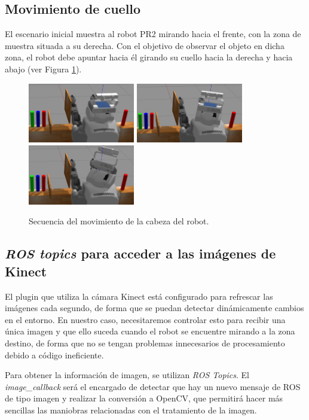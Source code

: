\documentclass[12pt,spanish,chapterprefix, numbers=noenddot]{book}
\numberwithin{equation}{section}
\numberwithin{figure}{section}
\begin{document}
\subsection{Movimiento de cuello}
El escenario inicial muestra al robot PR2 mirando hacia el frente, con la zona de muestra situada a su derecha. Con el objetivo de observar el objeto en dicha zona, el robot debe apuntar hacia él girando su cuello hacia la derecha y hacia abajo (ver Figura \ref{fig:cuello}).

\begin{figure}[hbt!]
\centering
\includegraphics[width=4.66cm]{Figs/fase1_1.png}
\includegraphics[width=4.66cm]{Figs/fase1_2.png}
\includegraphics[width=4.66cm]{Figs/fase1_4.png}
\par
\caption{\label{fig:cuello}Secuencia del movimiento de la cabeza del robot.}
\end{figure}

\subsection{\textit{ROS topics} para acceder a las imágenes de Kinect} 

El plugin que utiliza la cámara Kinect está configurado para refrescar las imágenes cada segundo, de forma que se puedan detectar dinámicamente cambios en el entorno.
En nuestro caso, necesitaremos controlar esto para recibir una única imagen y que ello suceda cuando el robot se encuentre mirando a la zona destino, de forma que no se tengan problemas innecesarios de procesamiento debido a código ineficiente.

Para obtener la información de imagen, se utilizan \textit{ROS Topics}. El \textit{image\_callback} será el encargado de detectar que hay un nuevo mensaje de ROS de tipo imagen y realizar la conversión a OpenCV, que permitirá hacer más sencillas las maniobras relacionadas con el tratamiento de la imagen.
\end{document}
